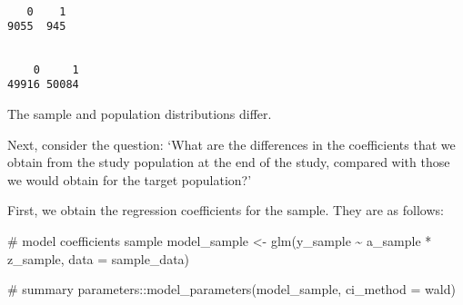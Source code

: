 \documentclass[
  single column]{article}
\newenvironment{Shaded}{\begin{snugshade}}{\end{snugshade}}
\newcommand{\AttributeTok}[1]{\textcolor[rgb]{0.40,0.45,0.13}{#1}}
\newcommand{\CommentTok}[1]{\textcolor[rgb]{0.37,0.37,0.37}{#1}}
\newcommand{\FunctionTok}[1]{\textcolor[rgb]{0.28,0.35,0.67}{#1}}
\newcommand{\NormalTok}[1]{\textcolor[rgb]{0.00,0.23,0.31}{#1}}
\newcommand{\OtherTok}[1]{\textcolor[rgb]{0.00,0.23,0.31}{#1}}
\newcommand{\SpecialCharTok}[1]{\textcolor[rgb]{0.37,0.37,0.37}{#1}}
\newcommand{\StringTok}[1]{\textcolor[rgb]{0.13,0.47,0.30}{#1}}
\begin{document}
\begin{Shaded}
\end{Shaded}

\begin{verbatim}

   0    1 
9055  945 
\end{verbatim}

\begin{Shaded}
\end{Shaded}

\begin{verbatim}

    0     1 
49916 50084 
\end{verbatim}

The sample and population distributions differ.

Next, consider the question: `What are the differences in the
coefficients that we obtain from the study population at the end of the
study, compared with those we would obtain for the target population?'

First, we obtain the regression coefficients for the sample. They are as
follows:

\begin{Shaded}
\begin{Highlighting}[]
\CommentTok{\# model coefficients sample}
\NormalTok{model\_sample  }\OtherTok{\textless{}{-}} \FunctionTok{glm}\NormalTok{(y\_sample }\SpecialCharTok{\textasciitilde{}}\NormalTok{ a\_sample }\SpecialCharTok{*}\NormalTok{ z\_sample, }
  \AttributeTok{data =}\NormalTok{ sample\_data)}

\CommentTok{\# summary}
\NormalTok{parameters}\SpecialCharTok{::}\FunctionTok{model\_parameters}\NormalTok{(model\_sample, }\AttributeTok{ci\_method =} \StringTok{\textquotesingle{}wald\textquotesingle{}}\NormalTok{)}
\end{Highlighting}
\end{Shaded}
\end{document}
